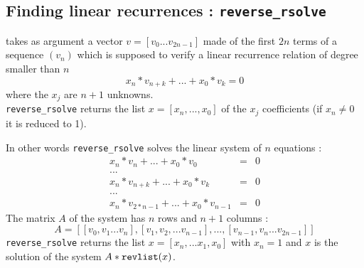 \documentclass[a4paper,11pt]{book}
\begin{document}
\subsection{Finding linear recurrences : {\tt reverse\_rsolve}}
 takes as argument a vector 
$v=[v_0...v_{2n-1}]$ made of the first $2n$ terms of a sequence $(v_n)$
which is supposed to verify a linear recurrence relation of 
degree smaller than $n$
\[ x_n*v_{n+k}+...+x_0*v_k=0 \]
where the $x_j$ are $n+1$ unknowns.\\
{\tt reverse\_rsolve} returns the list $x=[x_n,...,x_0]$
of the $x_j$ coefficients (if $x_n\neq 0$ it is reduced to 1).

In other words {\tt reverse\_rsolve} solves the linear system of  
 $n$ equations :
\begin{eqnarray*}
x_n*v_{n}+...+x_0*v_0 &=&0 \\
...\\
x_n*v_{n+k}+...+x_0*v_k &=&0 \\
...\\
x_n*v_{2*n-1}+...+x_0*v_{n-1}&=&0
\end{eqnarray*}
The matrix $A$ of the system has $n$ rows and $n+1$ columns :
\[ A=[[v_0,v_1...v_n],[v_1,v_2,...v_{n-1}],...,[v_{n-1},v_n...v_{2n-1}]] \]
{\tt reverse\_rsolve} returns the list $x=[x_n,...x_1,x_0]$ with $x_n=1$
and $x$ is the solution of the system $A*{\tt revlist}(x)$.
\end{document}
